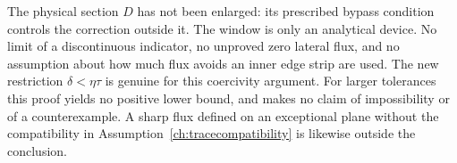 \begin{remark}
\label{ch:outerwindowscope}
The physical section $D$ has not been enlarged: its prescribed bypass
condition controls the correction outside it.  The window is only an
analytical device.  No limit of a discontinuous indicator, no unproved
zero lateral flux, and no assumption about how much flux avoids an inner
edge strip are used.  The new restriction $\delta<\eta\tau$ is genuine
for this coercivity argument.  For larger tolerances this proof yields no
positive lower bound, and makes no claim of impossibility or of a
counterexample.  A sharp flux defined on an exceptional plane without the
compatibility in Assumption~\ref{ch:tracecompatibility} is likewise outside
the conclusion.
\end{remark}

